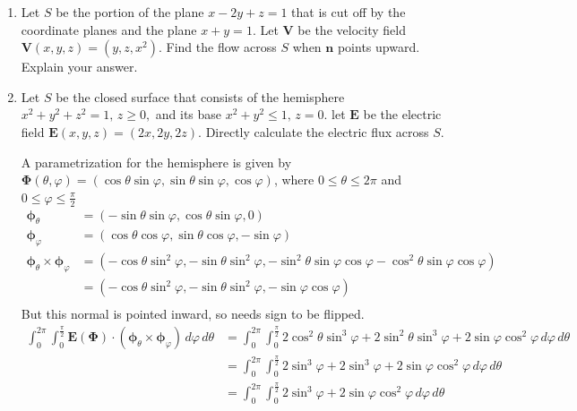 \documentclass{article}
\begin{document}
\begin{enumerate}
    \item Let $S$ be the portion of the plane $x-2y+z=1$ that is cut off by the coordinate planes and the plane $x+y=1$. Let $\boldsymbol V$ be the velocity field $\boldsymbol V (x,y,z) = (y,z,x^2)$. Find the flow across $S$ when $\boldsymbol n$ points upward. Explain your answer.

    \item Let $S$ be the closed surface that consists of the hemisphere $x^2+y^2+z^2 = 1,\, z \geq 0,$ and its base $x^2 + y^2 \leq 1,\, z = 0.$ let $\boldsymbol E$ be the electric field $\boldsymbol E(x,y,z) = (2x,2y,2z).$ Directly calculate the electric flux across $S$.
        
                A parametrization for the hemisphere is given by $\boldsymbol \Phi (\theta, \varphi) = (\cos\theta \sin\varphi, \sin\theta \sin\varphi, \cos\varphi)$, where $0 \leq \theta \leq 2\pi$ and $\displaystyle 0 \leq \varphi \leq \frac{\pi}{2}$
                \begin{align*}
                \boldsymbol \phi_{\theta} &= (- \sin \theta \sin \varphi, \cos \theta \sin \varphi, 0)\\
                \boldsymbol \phi_{\varphi} &= (\cos \theta \cos \varphi, \sin \theta \cos \varphi, -\sin \varphi) \\
                \boldsymbol \phi_\theta \times \boldsymbol \phi_\varphi &= (-\cos\theta \sin^2\varphi, -\sin\theta \sin^2\varphi, - \sin^2\theta \sin\varphi \cos\varphi - \cos^2\theta \sin \varphi \cos \varphi) \\ 
                &= (-\cos\theta \sin^2\varphi, -\sin\theta \sin^2\varphi, - \sin\varphi \cos\varphi ) \\ 
                \end{align*} 
                But this normal is pointed inward, so needs sign to be flipped.
                \begin{align*}
                \int_0^{2\pi} \int_0^{\frac{\pi}{2}} \boldsymbol E ( \boldsymbol \Phi ) \cdot ( \boldsymbol \phi_{\theta} \times \boldsymbol \phi_{\varphi}) \, d\varphi \, d\theta &= \int_0^{2\pi} \int_0^{\frac{\pi}{2}} 2 \cos^2 \theta \sin^3 \varphi + 2\sin^2 \theta \sin^3 \varphi + 2 \sin \varphi \cos^2 \varphi \, d\varphi \, d\theta \\
                &= \int_0^{2\pi} \int_0^{\frac{\pi}{2}} 2 \sin^3 \varphi + 2\sin^3 \varphi + 2 \sin \varphi \cos^2 \varphi \, d\varphi \, d\theta \\
                &= \int_0^{2\pi} \int_0^{\frac{\pi}{2}} 2\sin^3 \varphi + 2 \sin \varphi \cos^2 \varphi \, d\varphi \, d\theta \\

\end{align*}
\end{enumerate}
\end{document}
